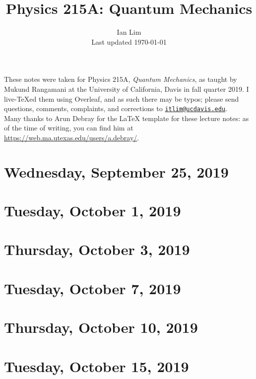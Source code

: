 \documentclass{../mynotes}
\begin{document}
\title{Physics 215A: Quantum Mechanics}
\author{Ian Lim\\ Last updated \today}
\maketitle
{\small\noindent These notes were taken for Physics 215A, \emph{Quantum Mechanics}, as taught by Mukund Rangamani at the University of California, Davis in fall quarter 2019. I live-\TeX ed them using Overleaf, and as such there may be typos; please send questions, comments, complaints, and corrections to 
\href{mailto:itlim@ucdavis.edu?subject=215A\%20Lecture\%20Notes}{\texttt{itlim@ucdavis.edu}}.\\
Many thanks to Arun Debray for the {\LaTeX} template for these lecture notes: as of the time of writing, you can find him at \url{https://web.ma.utexas.edu/users/a.debray/}.}

\tableofcontents

\section{Wednesday, September 25, 2019}
	

\section{Tuesday, October 1, 2019}
    

\section{Thursday, October 3, 2019}
    
\section{Tuesday, October 7, 2019}
    
    
\section{Thursday, October 10, 2019}
    
    
\section{Tuesday, October 15, 2019}
    
\end{document}
